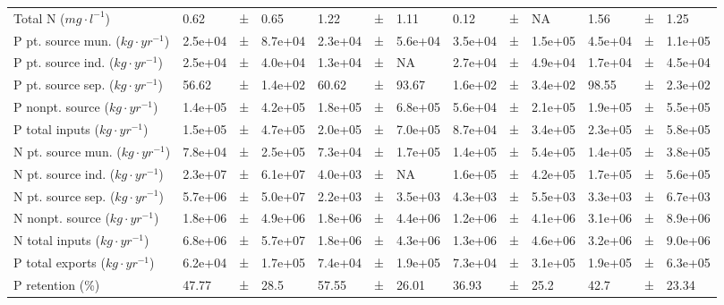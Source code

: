 \documentclass[journal abbreviations, manuscript]{copernicus}
\begin{document}
\begin{table}[t]
\begin{tabular}{lllllllllllll}
Total N ($mg \cdot l^{-1}$) & 0.62 & ± & 0.65 & 1.22 & ± & 1.11 & 0.12 & ± & NA & 1.56 & ± & 1.25\\

P pt. source mun. ($kg \cdot yr^{-1}$) & 2.5e+04 & ± & 8.7e+04 & 2.3e+04 & ± & 5.6e+04 & 3.5e+04 & ± & 1.5e+05 & 4.5e+04 & ± & 1.1e+05\\

P pt. source ind. ($kg \cdot yr^{-1}$) & 2.5e+04 & ± & 4.0e+04 & 1.3e+04 & ± & NA & 2.7e+04 & ± & 4.9e+04 & 1.7e+04 & ± & 4.5e+04\\

P pt. source sep. ($kg \cdot yr^{-1}$) & 56.62 & ± & 1.4e+02 & 60.62 & ± & 93.67 & 1.6e+02 & ± & 3.4e+02 & 98.55 & ± & 2.3e+02\\

P nonpt. source ($kg \cdot yr^{-1}$) & 1.4e+05 & ± & 4.2e+05 & 1.8e+05 & ± & 6.8e+05 & 5.6e+04 & ± & 2.1e+05 & 1.9e+05 & ± & 5.5e+05\\

P total inputs ($kg \cdot yr^{-1}$) & 1.5e+05 & ± & 4.7e+05 & 2.0e+05 & ± & 7.0e+05 & 8.7e+04 & ± & 3.4e+05 & 2.3e+05 & ± & 5.8e+05\\

N pt. source mun. ($kg \cdot yr^{-1}$) & 7.8e+04 & ± & 2.5e+05 & 7.3e+04 & ± & 1.7e+05 & 1.4e+05 & ± & 5.4e+05 & 1.4e+05 & ± & 3.8e+05\\

N pt. source ind. ($kg \cdot yr^{-1}$) & 2.3e+07 & ± & 6.1e+07 & 4.0e+03 & ± & NA & 1.6e+05 & ± & 4.2e+05 & 1.7e+05 & ± & 5.6e+05\\

N pt. source sep. ($kg \cdot yr^{-1}$) & 5.7e+06 & ± & 5.0e+07 & 2.2e+03 & ± & 3.5e+03 & 4.3e+03 & ± & 5.5e+03 & 3.3e+03 & ± & 6.7e+03\\

N nonpt. source ($kg \cdot yr^{-1}$) & 1.8e+06 & ± & 4.9e+06 & 1.8e+06 & ± & 4.4e+06 & 1.2e+06 & ± & 4.1e+06 & 3.1e+06 & ± & 8.9e+06\\

N total inputs ($kg \cdot yr^{-1}$) & 6.8e+06 & ± & 5.7e+07 & 1.8e+06 & ± & 4.3e+06 & 1.3e+06 & ± & 4.6e+06 & 3.2e+06 & ± & 9.0e+06\\

P total exports ($kg \cdot yr^{-1}$) & 6.2e+04 & ± & 1.7e+05 & 7.4e+04 & ± & 1.9e+05 & 7.3e+04 & ± & 3.1e+05 & 1.9e+05 & ± & 6.3e+05\\

P retention (\%) & 47.77 & ± & 28.5 & 57.55 & ± & 26.01 & 36.93 & ± & 25.2 & 42.7 & ± & 23.34\\


\end{tabular}
\end{table}
\end{document}
